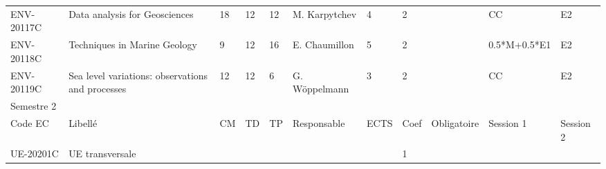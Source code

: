 \documentclass[a4paper,11pt]{article}
\begin{document}
{{\begin{tabular}{lllllllllll}
ENV-20117C                     & Data analysis for Geosciences                                                             & 18                        & 12                        & 12                        & M. Karpytchev                      & 4                           & 2                           &                                    & CC                               & E2                               \\
ENV-20118C                     & Techniques in Marine Geology                                                              & 9                         & 12                        & 16                        & E. Chaumillon                      & 5                           & 2                           &                                    & 0.5*M+0.5*E1                     & E2                               \\
ENV-20119C                     & Sea level variations: observations and processes                                          & 12                        & 12                        & 6                         & G. Wöppelmann                      & 3                           & 2                           &                                    & CC                               & E2                               \\
\rowcolor[HTML]{656565} 
Semestre 2                     &                                                                                           &                           &                           &                           &                                    &                             &                             &                                    &                                  &                                  \\
\rowcolor[HTML]{9B9B9B} 
Code EC                        & Libellé                                                                                   & CM                        & TD                        & TP                        & Responsable                        & ECTS                        & Coef                        & Obligatoire                        & Session 1                        & Session 2                        \\
\rowcolor[HTML]{C0C0C0} 
UE-20201C                      & UE transversale                                                                           &                           &                           &                           &                                    &                             & 1                           &                                    &                                  &                                  \\

\end{tabular}}}
\end{document}
